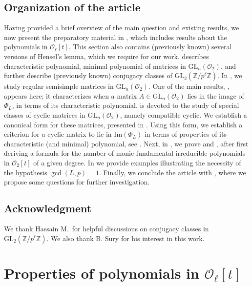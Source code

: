 \documentclass[11pt,twoside]{amsart}
\newcommand{\GL}{\mathrm{GL}}
\newcommand{\im}{\mathrm{Im}}
\newcommand{\Z}{\mathbb{Z}}
\newcommand{\R}{\mathscr{O}_2}
\theoremstyle{definition} %
\begin{document}
\subsection*{Organization of the article} 
Having provided a brief overview of the main question and existing results, we now present the preparatory material in , which includes results about the polynomials in $\mathscr O_\ell[t]$.
This section also contains (previously known) several versions of Hensel's lemma, which we require for our work.  describes characteristic polynomial, minimal polynomial of matrices in $\GL_n(\R)$, and further describe (previously known) conjugacy classes of $\GL_2(\Z/p^{\ell}\Z)$. In , we study regular semisimple matrices in $\GL_n(\R)$. One of the main results, , appears here; it characterizes when a matrix $A \in \GL_n(\R)$ lies in the image of $\Phi_L$, in terms of its characteristic polynomial.
 is devoted to the study of special classes of cyclic matrices in $\GL_n(\R)$, namely compatible cyclic. 
We establish a canonical form for these matrices, presented in .
Using this form, we establish a criterion for a cyclic matrix to lie in $\im(\Phi_L)$ in terms of properties of its characteristic (and minimal) polynomial, see .
Next, in , we prove  and , after first deriving a formula for the number of monic fundamental irreducible polynomials in $\R[t]$ of a given degree.  
In  we provide examples illustrating the necessity of the hypothesis $\gcd(L,p)=1$. Finally, we conclude the article with , where we propose some questions for further investigation.
\color{black}
\subsection*{Acknowledgment} 
We thank Hassain M.\ for helpful discussions on conjugacy classes in $\GL_2(\Z/p^\ell\Z)$. We also thank B. Sury for his interest in this work. 


\section{Properties of polynomials in $\mathscr O_\ell[t]$}\label{sec:result-polynomials}
\end{document}
